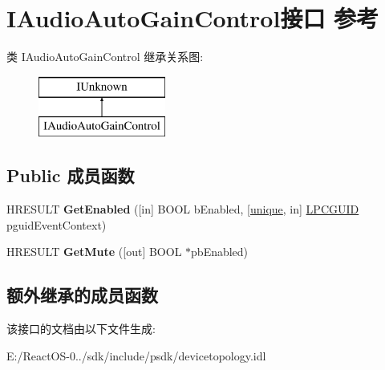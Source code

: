\hypertarget{interface_i_audio_auto_gain_control}{}\section{I\+Audio\+Auto\+Gain\+Control接口 参考}
\label{interface_i_audio_auto_gain_control}
类 I\+Audio\+Auto\+Gain\+Control 继承关系图\+:\begin{figure}[H]
\begin{center}
\leavevmode
\includegraphics[height=2.000000cm]{interface_i_audio_auto_gain_control}
\end{center}
\end{figure}
\subsection*{Public 成员函数}
\begin{DoxyCompactItemize}
\item 
\mbox{\label{interface_i_audio_auto_gain_control_aa7dc747b7d7ae32152eb0631f14a7270}} 
H\+R\+E\+S\+U\+LT {\bfseries Get\+Enabled} (\mbox{[}in\mbox{]} B\+O\+OL b\+Enabled, \mbox{[}\hyperlink{interfaceunique}{unique}, in\mbox{]} \hyperlink{interface_g_u_i_d}{L\+P\+C\+G\+U\+ID} pguid\+Event\+Context)
\item 
\mbox{\label{interface_i_audio_auto_gain_control_acb548b11836e870da8c7cea4ec5639d7}} 
H\+R\+E\+S\+U\+LT {\bfseries Get\+Mute} (\mbox{[}out\mbox{]} B\+O\+OL $\ast$pb\+Enabled)
\end{DoxyCompactItemize}
\subsection*{额外继承的成员函数}


该接口的文档由以下文件生成\+:\begin{DoxyCompactItemize}
\item 
E\+:/\+React\+O\+S-\/0../sdk/include/psdk/devicetopology.\+idl\end{DoxyCompactItemize}
